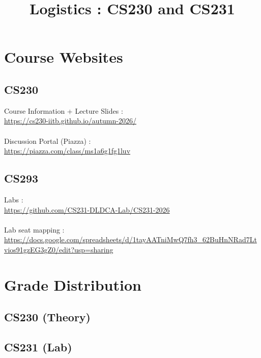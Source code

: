 \documentclass{article}
\title{Logistics : CS230 and CS231}
\date{}
\begin{document}
\maketitle

\section{Course Websites}
\subsection{CS230}
Course Information + Lecture Slides : \\\url{https://cs230-iitb.github.io/autumn-2026/}\\\\
Discussion Portal (Piazza) : \\\url{https://piazza.com/class/ms1a6g1fg1luv}
\subsection{CS293}
Labs : \\
\url{https://github.com/CS231-DLDCA-Lab/CS231-2026}
\\\\
Lab seat mapping : \\\url{https://docs.google.com/spreadsheets/d/1tayAATniMwQ7fh3_62BuHnNRad7Ltvios91gzEG3gZ0/edit?usp=sharing}
\newpage
\section{Grade Distribution}
\subsection{CS230 (Theory)}
\subsection{CS231 (Lab)}
\end{document}
